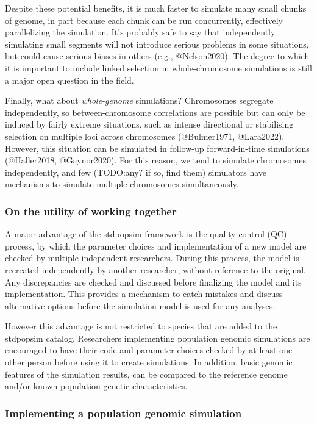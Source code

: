 \documentclass[hidelinks]{article}
\begin{document}
Despite these potential benefits, it is much faster to simulate many
small chunks of genome, in part because each chunk can be run
concurrently, effectively parallelizing the simulation. It's probably
safe to say that independently simulating small segments will not
introduce serious problems in some situations, but could cause serious
biases in others (e.g., @Nelson2020). The degree to which it is
important to include linked selection in whole-chromosome simulations is
still a major open question in the field.

Finally, what about \emph{whole-genome} simulations? Chromosomes
segregate independently, so between-chromosome correlations are possible
but can only be induced by fairly extreme situations, such as intense
directional or stabilising selection on multiple loci across chromosomes
(@Bulmer1971, @Lara2022). However, this situation can be simulated in
follow-up forward-in-time simulations (@Haller2018, @Gaynor2020). For
this reason, we tend to simulate chromosomes independently, and few
(TODO:any? if so, find them) simulators have mechanisms to simulate
multiple chromosomes simultaneously.

\hypertarget{on-the-utility-of-working-together}{%
\subsubsection{On the utility of working
together}\label{on-the-utility-of-working-together}}

A major advantage of the stdpopsim framework is the quality control (QC)
process, by which the parameter choices and implementation of a new
model are checked by multiple independent researchers. During this
process, the model is recreated independently by another researcher,
without reference to the original. Any discrepancies are checked and
discussed before finalizing the model and its implementation. This
provides a mechanism to catch mistakes and discuss alternative options
before the simulation model is used for any analyses.

However this advantage is not restricted to species that are added to
the stdpopsim catalog. Researchers implementing population genomic
simulations are encouraged to have their code and parameter choices
checked by at least one other person before using it to create
simulations. In addition, basic genomic features of the simulation
results, can be compared to the reference genome and/or known population
genetic characteristics.

\hypertarget{implementing-a-population-genomic-simulation}{%
\subsubsection{Implementing a population genomic
simulation}\label{implementing-a-population-genomic-simulation}}
\end{document}
